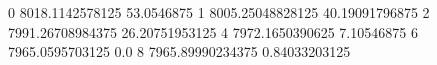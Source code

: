 0 8018.1142578125 53.0546875
1 8005.25048828125 40.19091796875
2 7991.26708984375 26.20751953125
4 7972.1650390625 7.10546875
6 7965.0595703125 0.0
8 7965.89990234375 0.84033203125
